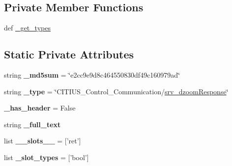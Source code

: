 \subsection*{\-Private \-Member \-Functions}
\begin{DoxyCompactItemize}
\item 
def \hyperlink{class_c_i_t_i_u_s___control___communication_1_1srv_1_1__srv__dzoom_1_1srv__dzoom_response_ad7258879f106c62b989d21efbbdb2ee0}{\-\_\-get\-\_\-types}
\end{DoxyCompactItemize}
\subsection*{\-Static \-Private \-Attributes}
\begin{DoxyCompactItemize}
\item 
\hypertarget{class_c_i_t_i_u_s___control___communication_1_1srv_1_1__srv__dzoom_1_1srv__dzoom_response_a5e8a4a8fff79c9b4dcb2e6d55233dfae}{string {\bfseries \-\_\-md5sum} = \char`\"{}e2cc9e9d8c464550830df49c160979ad\char`\"{}}\label{class_c_i_t_i_u_s___control___communication_1_1srv_1_1__srv__dzoom_1_1srv__dzoom_response_a5e8a4a8fff79c9b4dcb2e6d55233dfae}

\item 
\hypertarget{class_c_i_t_i_u_s___control___communication_1_1srv_1_1__srv__dzoom_1_1srv__dzoom_response_ac75858ed463a184490c1f69ff1c0d42b}{string {\bfseries \-\_\-type} = \char`\"{}\-C\-I\-T\-I\-U\-S\-\_\-\-Control\-\_\-\-Communication/\hyperlink{class_c_i_t_i_u_s___control___communication_1_1srv_1_1__srv__dzoom_1_1srv__dzoom_response}{srv\-\_\-dzoom\-Response}\char`\"{}}\label{class_c_i_t_i_u_s___control___communication_1_1srv_1_1__srv__dzoom_1_1srv__dzoom_response_ac75858ed463a184490c1f69ff1c0d42b}

\item 
\hypertarget{class_c_i_t_i_u_s___control___communication_1_1srv_1_1__srv__dzoom_1_1srv__dzoom_response_a734046aafdce22dd260cd0d214a930ae}{{\bfseries \-\_\-has\-\_\-header} = \-False}\label{class_c_i_t_i_u_s___control___communication_1_1srv_1_1__srv__dzoom_1_1srv__dzoom_response_a734046aafdce22dd260cd0d214a930ae}

\item 
string {\bfseries \-\_\-full\-\_\-text}
\item 
\hypertarget{class_c_i_t_i_u_s___control___communication_1_1srv_1_1__srv__dzoom_1_1srv__dzoom_response_a49b416be691f185a93557c7acadbbd10}{list {\bfseries \-\_\-\-\_\-slots\-\_\-\-\_\-} = \mbox{[}'ret'\mbox{]}}\label{class_c_i_t_i_u_s___control___communication_1_1srv_1_1__srv__dzoom_1_1srv__dzoom_response_a49b416be691f185a93557c7acadbbd10}

\item 
\hypertarget{class_c_i_t_i_u_s___control___communication_1_1srv_1_1__srv__dzoom_1_1srv__dzoom_response_a8579bcd82f53e7bde3d5835481301780}{list {\bfseries \-\_\-slot\-\_\-types} = \mbox{[}'bool'\mbox{]}}\label{class_c_i_t_i_u_s___control___communication_1_1srv_1_1__srv__dzoom_1_1srv__dzoom_response_a8579bcd82f53e7bde3d5835481301780}

\end{DoxyCompactItemize}


